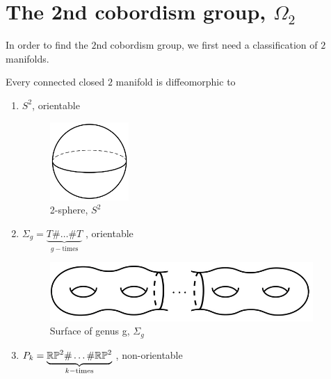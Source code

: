 \section{The 2nd cobordism group, \texorpdfstring{$\Omega_{2}$}{Omega 2}}
In order to find the $2$nd cobordism group, we first need a classification of $2$ manifolds. %
\begin{prop}\label{Classification of 2 manifolds}
    Every connected closed $2$ manifold is diffeomorphic to
    \begin{enumerate}
        \item $S^2$, orientable
        \begin{figure}[!ht]
            \centering
            \includegraphics[width=3cm]{images/Lecture 3/sphere.png}
            \caption{2-sphere, $S^2$}
        \end{figure}
        \item $\Sigma_g = \underbrace{T \# \dots \# T}_{g-\text{times}}$ , orientable
        \begin{figure}[!ht]
            \centering
            \includegraphics[width=10cm]{images/Lecture 3/surface_of_genus_g.png}
            \caption{Surface of genus g, $\Sigma_g$}
        \end{figure}
        \item $P_k = \underbrace{\mathbb{R}\mathbb{P}^2 \# \dots \# \mathbb{R}\mathbb{P}^2}_{k-\text{times}}$ , non-orientable
        \begin{figure}[!ht]
            \centering

\end{figure}
\end{enumerate}
\end{prop}
